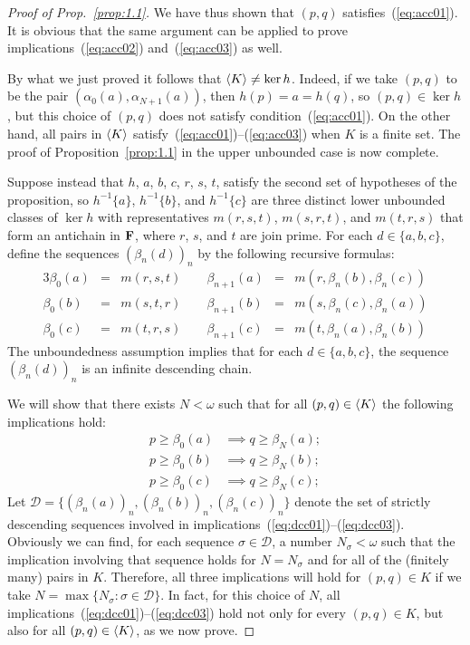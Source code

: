 \begin{proof}[Proof of Prop.~\ref{prop:1.1}]
    We have thus shown that $(p,q)$ satisfies~(\ref{eq:acc01}).
    It is obvious that the same argument can be applied to prove 
    implications~(\ref{eq:acc02}) and~(\ref{eq:acc03}) as well.
  
    \medskip

    By what we just proved it follows that
  $\langle K\rangle \neq \ker h$. Indeed, if we take $(p, q)$ to be 
  the pair $(\alpha_0(a), \alpha_{N+1}(a))$, then  $h(p) = a = h(q)$, 
  so $(p,q) \in \ker h$, but this choice of $(p,q)$ does not satisfy 
  condition~(\ref{eq:acc01}). On 
  the other hand, all pairs in $\langle K\rangle$ 
  satisfy~(\ref{eq:acc01})--(\ref{eq:acc03}) 
  when $K$ is a finite set.   The proof of Proposition~\ref{prop:1.1} 
  in the upper unbounded case is now complete.
  
  \bigskip
Suppose instead that $h$, $a$, $b$, $c$, $r$, $s$, $t$, satisfy the second 
set of hypotheses of the proposition, so $h^{-1}\{a\}$, $h^{-1}\{b\}$, 
and $h^{-1}\{c\}$ are three distinct 
lower unbounded classes of $\ker h$ with representatives $m(r,s,t)$, $m(s,r,t)$, and 
$m(t,r,s)$ that form an antichain in $\mathbf{F}$, where $r$, $s$, and $t$ are join 
prime.
For each $d\in \{a, b, c\}$, define the sequences $(\beta_n(d))_n$
by the following recursive formulas:
\begin{alignat*}{3}
  \beta_0(a)     &= & m(r,s,t)  \qquad 
  \beta_{n+1}(a) &= & m(r,\beta_n(b),\beta_n(c))\\
  \beta_0(b)     &= & m(s,t,r) \qquad  
  \beta_{n+1}(b) &= & m(s,\beta_n(c), \beta_n(a))\\
  \beta_0(c)     &= & m(t,r,s) \qquad   
  \beta_{n+1}(c) &= & m(t,\beta_n(a),\beta_n(b))
\end{alignat*}
The unboundedness assumption implies that for each 
$d \in \{a,b,c\}$, the sequence $(\beta_n(d))_n$ is
an infinite descending chain.

We will show that there exists $N < \omega$ such that 
for all $(p, q) \in \langle K\rangle$ 
the following implications hold:
\begin{align}
  p \geq \beta_0(a) &\implies q \geq \beta_N(a); \label{eq:dcc01}\\
  p \geq \beta_0(b) &\implies q \geq \beta_N(b); \label{eq:dcc02}\\ 
  p \geq \beta_0(c) &\implies q \geq \beta_N(c); \label{eq:dcc03}
\end{align}
Let $\mathcal D = \{(\beta_n(a))_n, (\beta_n(b))_n, (\beta_n(c))_n\}$
denote the set of strictly descending 
sequences involved in implications~(\ref{eq:dcc01})--(\ref{eq:dcc03}).
Obviously we can find, for each sequence $\sigma \in \mathcal D$,
a number $N_\sigma < \omega$ such that the implication involving that sequence 
holds for $N = N_\sigma$ and for all of the (finitely many) pairs in $K$.  
Therefore, all three implications will hold for $(p, q) \in K$ if we take 
$N = \max \{N_{\sigma} : \sigma \in \mathcal D\}$.
In fact, for this choice of $N$, all implications~(\ref{eq:dcc01})--(\ref{eq:dcc03}) hold 
not only for every $(p, q) \in K$, but also for all $(p, q) \in \langle K\rangle$,
as we now prove.


\end{proof}
